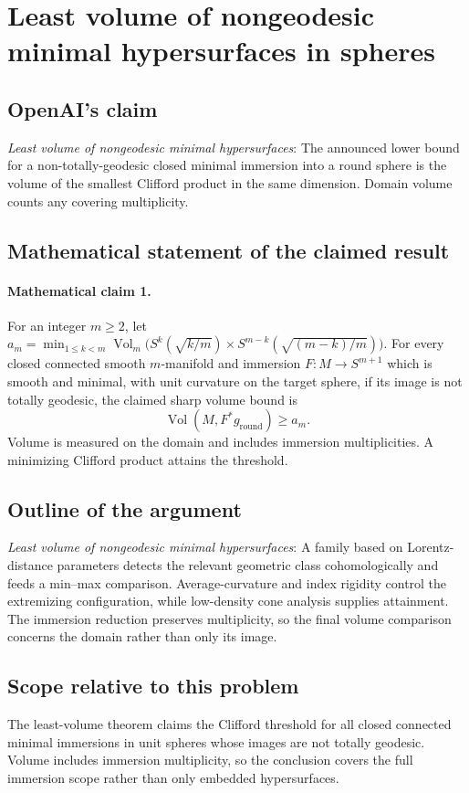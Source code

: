 \documentclass[11pt]{article}
\begin{document}
\section*{Least volume of nongeodesic minimal hypersurfaces in spheres}

\subsection{OpenAI's claim}
\textit{Least volume of nongeodesic minimal hypersurfaces}: The announced lower bound for a non-totally-geodesic closed minimal immersion into a round sphere is the volume of the smallest Clifford product in the same dimension. Domain volume counts any covering multiplicity.

\subsection{Mathematical statement of the claimed result}
\paragraph{Mathematical claim 1.} For an integer $m\ge2$, let $a_m=\min_{1\le k<m}\operatorname{Vol}_m\bigl(S^k(\sqrt{k/m})\times S^{m-k}(\sqrt{(m-k)/m})\bigr)$. For every closed connected smooth $m$-manifold and immersion $F:M\to S^{m+1}$ which is smooth and minimal, with unit curvature on the target sphere, if its image is not totally geodesic, the claimed sharp volume bound is \[\operatorname{Vol}(M,F^*g_{\mathrm{round}})\ge a_m.\] Volume is measured on the domain and includes immersion multiplicities. A minimizing Clifford product attains the threshold.

\subsection{Outline of the argument}
\textit{Least volume of nongeodesic minimal hypersurfaces}: A family based on Lorentz-distance parameters detects the relevant geometric class cohomologically and feeds a min--max comparison. Average-curvature and index rigidity control the extremizing configuration, while low-density cone analysis supplies attainment. The immersion reduction preserves multiplicity, so the final volume comparison concerns the domain rather than only its image.

\subsection{Scope relative to this problem}
The least-volume theorem claims the Clifford threshold for all closed connected minimal immersions in unit spheres whose images are not totally geodesic. Volume includes immersion multiplicity, so the conclusion covers the full immersion scope rather than only embedded hypersurfaces.
\end{document}
